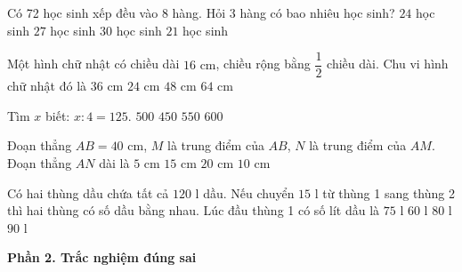 \begin{ex} %
Có 72 học sinh xếp đều vào 8 hàng. Hỏi 3 hàng có bao nhiêu học sinh?
\choice
{$24$ học sinh}
{\True $27$ học sinh}
{$30$ học sinh}
{$21$ học sinh}
\end{ex}

\begin{ex} %
Một hình chữ nhật có chiều dài $16\text{ cm}$, chiều rộng bằng $\dfrac{1}{2}$ chiều dài. Chu vi hình chữ nhật đó là
\choice
{$36\text{ cm}$}
{$24\text{ cm}$}
{\True $48\text{ cm}$}
{$64\text{ cm}$}
\end{ex}

\begin{ex} %
Tìm $x$ biết: $x : 4 = 125$.
\choice
{\True $500$}
{$450$}
{$550$}
{$600$}
\end{ex}

\begin{ex} %
Đoạn thẳng $AB = 40\text{ cm}$, $M$ là trung điểm của $AB$, $N$ là trung điểm của $AM$. Đoạn thẳng $AN$ dài là
\choice
{$5\text{ cm}$}
{$15\text{ cm}$}
{$20\text{ cm}$}
{\True $10\text{ cm}$}
\end{ex}

\begin{ex} %
Có hai thùng dầu chứa tất cả $120\text{ l}$ dầu. Nếu chuyển $15\text{ l}$ từ thùng 1 sang thùng 2 thì hai thùng có số dầu bằng nhau. Lúc đầu thùng 1 có số lít dầu là
\choice
{\True $75\text{ l}$}
{$60\text{ l}$}
{$80\text{ l}$}
{$90\text{ l}$}
\end{ex}

\textbf{Phần 2. Trắc nghiệm đúng sai}

